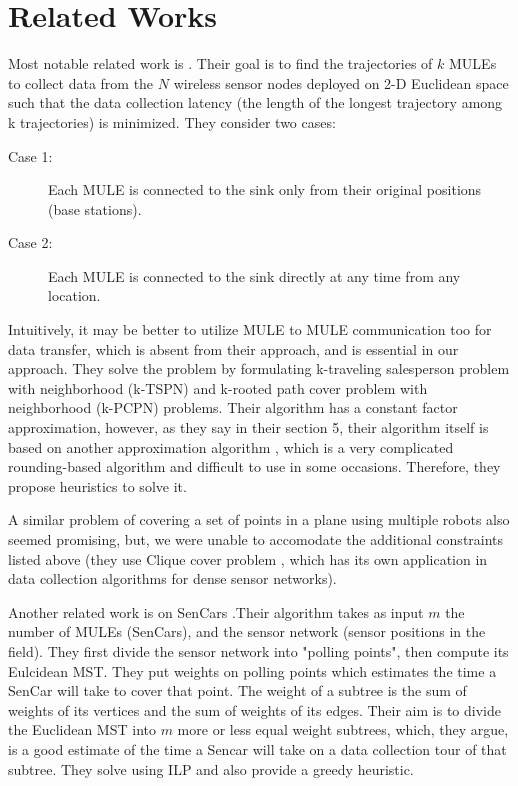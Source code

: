 \chapter{Related Works}
Most notable related work is \cite{sim}. Their goal is to find the trajectories of $k$ MULEs to collect data from the $N$ wireless sensor nodes deployed on 2-D Euclidean space such that the data collection latency (the length of the longest trajectory among k trajectories) is minimized. They consider two cases: 
\begin{description}
\item[Case 1:] Each MULE is connected to the sink only from their original positions (base stations).
\item[Case 2:] Each MULE is connected to the sink directly at any time from any location.
\end{description}
Intuitively, it may be better to utilize MULE to MULE communication too for data transfer, which is absent from their approach, and is essential in our approach. They solve the problem by formulating k-traveling salesperson problem with neighborhood (k-TSPN) and k-rooted path cover problem with neighborhood (k-PCPN) problems. Their algorithm has a constant factor approximation, however, as they say in their section 5, their algorithm itself is based on another approximation algorithm \cite{supportSim}, which is a very complicated rounding-based algorithm and difficult to use in some occasions. Therefore, they propose heuristics to solve it.

A similar problem of covering a set of points in a plane using multiple robots \cite{roboPlan} also seemed promising, but, we were unable to accomodate the additional constraints listed above (they use Clique cover problem \cite{minCliquePartition}, which has its own application in data collection algorithms for dense sensor networks).

Another related work \cite{sim4} is on SenCars \cite{sencar}.Their algorithm takes as input $m$ the number of MULEs (SenCars), and the sensor network (sensor positions in the field). They first divide the sensor network into "polling points", then compute its Eulcidean MST. They put weights on polling points which estimates the time a SenCar will take to cover that point. The weight of a subtree is the sum of weights of its vertices and the sum of weights of its edges. Their aim is to divide the Euclidean MST into $m$ more or less equal weight subtrees, which, they argue, is a good estimate of the time a Sencar will take on a data collection tour of that subtree. They solve using ILP and also provide a greedy heuristic.

